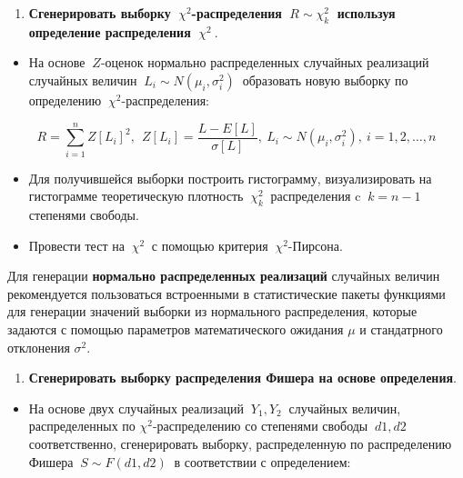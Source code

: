 \documentclass[
]{article}
\providecommand{\tightlist}{%
  \setlength{\itemsep}{0pt}\setlength{\parskip}{0pt}}
\begin{document}
\begin{enumerate}
\def\labelenumi{\arabic{enumi}.}
\setcounter{enumi}{1}
\tightlist
\item
  \textbf{Сгенерировать выборку \(\ \chi^2\)-распределения
  \(\ R \sim \chi_{k}^2\ \) используя определение распределения
  \(\ \chi^2\ \)}.
\end{enumerate}

\begin{itemize}
\tightlist
\item
  На основе \(\ Z\)-оценок нормально распределенных случайных реализаций
  случайных величин \(\ L_{i} \sim N(\mu_i, \sigma_i^2)\ \) образовать
  новую выборку по определению \(\ \chi^2\)-распределения:
\end{itemize}

\[
R = \sum_{i = 1}^{n} Z[L_i]^2,\ \ Z[L_i] = \frac{L - E[L]}{\sigma[L]}, \ L_i \sim N(\mu_i, \sigma_i^2),\ i = 1,2,\dots,n
\]

\begin{itemize}
\item
  Для получившейся выборки построить гистограмму, визуализировать на
  гистограмме теоретическую плотность \(\ \chi_k^2\ \) распределения c
  \(\ k = n-1\ \) степенями свободы.
\item
  Провести тест на \(\ \chi^2\ \) с помощью критерия
  \(\ \chi^2\)-Пирсона.
\end{itemize}

Для генерации \textbf{нормально распределенных реализаций} случайных
величин рекомендуется пользоваться встроенными в статистические пакеты
функциями для генерации значений выборки из нормального распределения,
которые задаются с помощью параметров математического ожидания \(\mu\) и
стандатрного отклонения \(\sigma^2\).

\begin{enumerate}
\def\labelenumi{\arabic{enumi}.}
\setcounter{enumi}{2}
\tightlist
\item
  \textbf{Сгенерировать выборку распределения Фишера на основе
  определения}.
\end{enumerate}

\begin{itemize}
\tightlist
\item
  На основе двух случайных реализаций \(\ Y_1, Y_2\ \) случайных
  величин, распределенных по \(\chi^2\)-распределению со степенями
  свободы \(\ d1, d2\ \) соответственно, сгенерировать выборку,
  распределенную по распределению Фишера \(\ S \sim F(d1, d2)\ \) в
  соответствии с определением:
\end{itemize}
\end{document}
